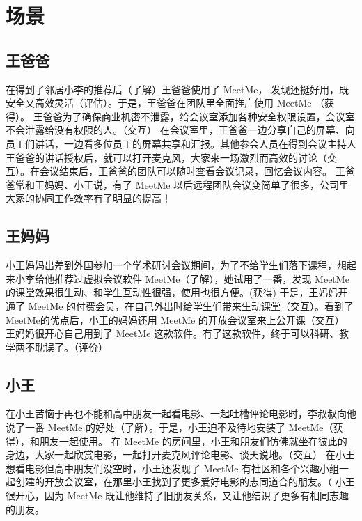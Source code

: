 \documentclass[a4paper,12pt]{article}
\begin{document}
    \section{场景}


    \subsection{王爸爸}
    在得到了邻居小李的推荐后（了解）王爸爸使用了 MeetMe， 发现还挺好用，既安全又高效灵活（评估）。于是，王爸爸在团队里全面推广使用 MeetMe （获得）。
    王爸爸为了确保商业机密不泄露，给会议室添加各种安全权限设置，会议室不会泄露给没有权限的人。（交互）
    在会议室里，王爸爸一边分享自己的屏幕、向员工们讲话，一边看多位员工的屏幕共享和汇报。其他参会人员在得到会议主持人王爸爸的讲话授权后，就可以打开麦克风，大家来一场激烈而高效的讨论（交互）。在会议结束后，王爸爸的团队可以随时查看会议记录，回忆会议内容。
    王爸爸常和王妈妈、小王说，有了 MeetMe 以后远程团队会议变简单了很多，公司里大家的协同工作效率有了明显的提高！

    \subsection{王妈妈}
    小王妈妈出差到外国参加一个学术研讨会议期间，为了不给学生们落下课程，想起来小李给他推荐过虚拟会议软件 MeetMe（了解），她试用了一番，发现 MeetMe 的课堂效果很生动、和学生互动性很强，使用也很方便。(获得)
    于是，王妈妈开通了 MeetMe 的付费会员，在自己外出时给学生们带来生动课堂（交互）。看到了 MeetMe的优点后，小王的妈妈还用 MeetMe 的开放会议室来上公开课（交互）
    王妈妈很开心自己用到了 MeetMe 这款软件。有了这款软件，终于可以科研、教学两不耽误了。（评价）

    \subsection{小王}
    在小王苦恼于再也不能和高中朋友一起看电影、一起吐槽评论电影时，李叔叔向他说了一番 MeetMe 的好处（了解）。于是，小王迫不及待地安装了 MeetMe（获得），和朋友一起使用。
    在 MeetMe 的房间里，小王和朋友们仿佛就坐在彼此的身边，大家一起欣赏电影，一起打开麦克风评论电影、谈天说地。（交互）
    在小王想看电影但高中朋友们没空时，小王还发现了 MeetMe 有社区和各个兴趣小组一起创建的开放会议室，在那里小王找到了更多爱好电影的志同道合的朋友。（
    小王很开心，因为 MeetMe 既让他维持了旧朋友关系，又让他结识了更多有相同志趣的朋友。
\end{document}
